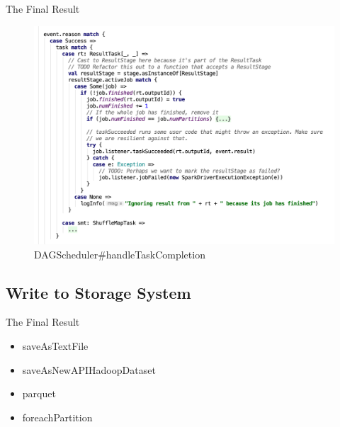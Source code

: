 \begin{frame}[plain,t]{The Final Result} %
	 \\ 
	\begin{figure}
		\centering
		\includegraphics[width=0.85\linewidth]{images/rdd009}
		\caption{DAGScheduler\#handleTaskCompletion}
		\label{fig:rdd009}
	\end{figure}
	
\end{frame}

\subsection{Write to Storage System}
\begin{frame}[plain,t]{The Final Result} %
	 \\  \vspace{2ex}
	\begin{itemize}
		\item saveAsTextFile
		\item saveAsNewAPIHadoopDataset
		\item parquet
		\item foreachPartition
	\end{itemize}
	
	
\end{frame}
